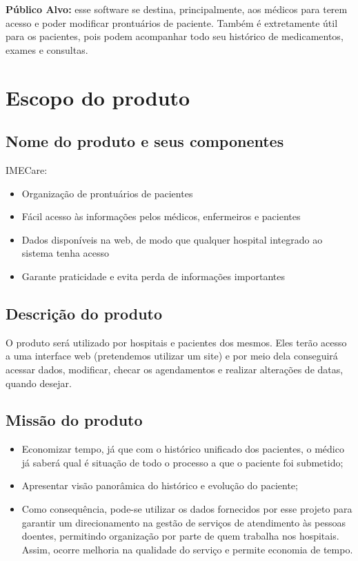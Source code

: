 \documentclass[11pt,a4paper]{report}
\begin{document}
\textbf{Público Alvo:} esse software se destina, principalmente, aos médicos para terem acesso e poder modificar prontuários de paciente. Também é extretamente útil para os pacientes, pois podem acompanhar todo seu histórico de medicamentos, exames e consultas.



\section{Escopo do produto}

\subsection{Nome do produto e seus componentes}
IMECare:

\begin{itemize}
\item Organização de prontuários de pacientes
\item Fácil acesso às informações pelos médicos, enfermeiros e pacientes
\item Dados disponíveis na web, de modo que qualquer hospital integrado ao sistema tenha acesso
\item Garante praticidade e evita perda de informações importantes 
\end{itemize}


\subsection{Descrição do produto}

O produto será utilizado por hospitais e pacientes dos mesmos. Eles terão acesso a uma interface web (pretendemos utilizar um site) e por meio dela conseguirá acessar dados, modificar, checar os agendamentos e realizar alterações de datas, quando desejar.



\subsection{Missão do produto}

\begin{itemize}

\item Economizar tempo, já que com o histórico unificado dos pacientes, o médico já saberá qual é situação de todo o processo a que o paciente foi submetido;
\item Apresentar visão panorâmica do histórico e evolução do paciente;
\item Como consequência, pode-se utilizar os dados fornecidos por esse projeto para garantir um direcionamento na gestão de serviços de atendimento às pessoas doentes, permitindo organização por parte de quem trabalha nos hospitais. Assim, ocorre melhoria na qualidade do serviço e permite economia de tempo.

\end{itemize}
\end{document}

